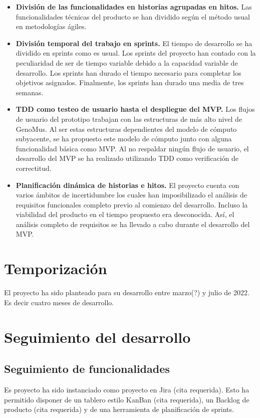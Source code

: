 \begin{itemize}
    \item \textbf{División de las funcionalidades en historias agrupadas en hitos.} Las funcionalidades técnicas del producto se han dividido según el método usual en metodologías ágiles. 
    
    \item \textbf{División temporal del trabajo en sprints.} El tiempo de desarrollo se ha dividido en sprints como es usual. Los sprints del proyecto han contado con la peculiaridad de ser de tiempo variable debido a la capacidad variable de desarrollo. Los sprints han durado el tiempo necesario para completar los objetivos asignados. Finalmente, los sprints han durado una media de tres semanas.

    \item \textbf{TDD como testeo de usuario hasta el despliegue del MVP.} Los flujos de usuario del prototipo trabajan con las estructuras de más alto nivel de GenoMus. Al ser estas estructuras dependientes del modelo de cómputo subyacente, se ha propuesto este modelo de cómputo junto con alguna funcionalidad básica como MVP. Al no respaldar ningún flujo de usuario, el desarrollo del MVP se ha realizado utilizando TDD como verificación de correctitud.
    
    \item \textbf{Planificación dinámica de historias e hitos.} El proyecto cuenta con varios ámbitos de incertidumbre los cuales han imposibilizado el análisis de requisitos funcionales completo previo al comienzo del desarrollo. Incluso la viabilidad del producto en el tiempo propuesto era desconocida. Así, el análisis completo de requisitos se ha llevado a cabo durante el desarrollo del MVP.
\end{itemize}

\section{Temporización}

El proyecto ha sido planteado para su desarrollo entre marzo(?) y julio de 2022. Es decir cuatro meses de desarrollo.

\section{Seguimiento del desarrollo}

\subsection{Seguimiento de funcionalidades}
Es proyecto ha sido instanciado como proyecto en Jira (cita requerida). Esto ha permitido disponer de un tablero estilo KanBan (cita requerida), un Backlog de producto (cita requerida) y de una herramienta de planificación de sprints.

